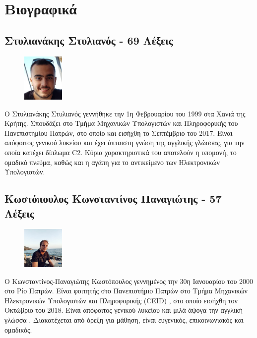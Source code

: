 \documentclass{article}
\newcommand{\en}{\selectlanguage{english}}
\newcommand{\gr}{\selectlanguage{greek}}
\begin{document}
\section{Βιογραφικά}
\subsection*{Στυλιανάκης Στυλιανός - 69 Λέξεις}
\begin{figure}
	\includegraphics[width=2cm]{Stylianakis.jpg}
\end{figure} 
Ο Στυλιανάκης Στυλιανός γεννήθηκε την 1η Φεβρουαρίου του 1999 στα Χανιά της Κρήτης. Σπουδάζει στο Τμήμα Μηχανικών Υπολογιστών και Πληροφορικής του Πανεπιστημίου Πατρών, στο οποίο και εισήχθη το Σεπτέμβριο του 2017. Είναι απόφοιτος γενικού λυκείου και έχει άπταιστη γνώση της αγγλικής γλώσσας, για την οποία κατέχει δίπλωμα C2. Κύρια χαρακτηριστικά του αποτελούν η υπομονή, το ομαδικό πνεύμα, καθώς και η αγάπη για το αντικείμενο των Ηλεκτρονικών Υπολογιστών. 

\subsection*{Κωστόπουλος Κωνσταντίνος Παναγιώτης - 57 Λέξεις}
\begin{figure}
	\includegraphics[width=2cm]{Kostopoulos.jpg}
\end{figure} 
Ο Κωνσταντίνος-Παναγιώτης Κωστόπουλος γεννημένος την 30η Ιανουαρίου του 2000 στο Ρίο Πατρών. Είναι φοιτητής στο Πανεπιστήμιο Πατρών στο Τμήμα Μηχανικών Ηλεκτρονικών Υπολογιστών και Πληροφορικής \en(CEID) \gr, στο οποίο εισήχθη τον Οκτώβριο του 2018. Είναι απόφοιτος γενικού λυκείου και μιλά άψογα την αγγλική γλώσσα . Διακατέχεται από όρεξη για μάθηση, είναι ευγενικός, επικοινωνιακός και ομαδικός.
\end{document}
